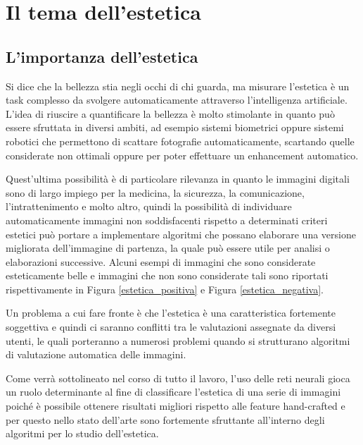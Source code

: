 \chapter{Il tema dell'estetica}
\label{estetica}

\section{L'importanza dell'estetica}
Si dice che la bellezza stia negli occhi di chi guarda, ma misurare l'estetica è un task complesso da svolgere automaticamente \cite{kanwal2021survey} attraverso l'intelligenza artificiale. L'idea di riuscire a quantificare la bellezza è molto stimolante in quanto può essere sfruttata in diversi ambiti, ad esempio sistemi biometrici oppure sistemi robotici che permettono di scattare fotografie automaticamente, scartando quelle considerate non ottimali oppure per poter effettuare un enhancement automatico. 

Quest'ultima possibilità è di particolare rilevanza in quanto le immagini digitali sono di largo impiego per la medicina, la sicurezza, la comunicazione, l'intrattenimento e molto altro, quindi la possibilità di individuare automaticamente immagini non soddisfacenti rispetto a determinati criteri estetici può portare a implementare algoritmi che possano elaborare una versione migliorata dell'immagine di partenza, la quale può essere utile per analisi o elaborazioni successive. Alcuni esempi di immagini che sono considerate esteticamente belle e immagini che non sono considerate tali sono riportati rispettivamente in Figura \ref{estetica_positiva} e Figura \ref{estetica_negativa}.
 
Un problema a cui fare fronte è che l'estetica è una caratteristica fortemente soggettiva e quindi ci saranno conflitti tra le valutazioni assegnate da diversi utenti, le quali porteranno a numerosi problemi quando si strutturano algoritmi di valutazione automatica delle immagini.


Come verrà sottolineato nel corso di tutto il lavoro, l'uso delle reti neurali gioca un ruolo determinante al fine di classificare l'estetica di una serie di immagini poiché è possibile ottenere risultati migliori rispetto alle feature hand-crafted e per questo nello stato dell'arte sono fortemente sfruttante all'interno degli algoritmi per lo studio dell'estetica. 

